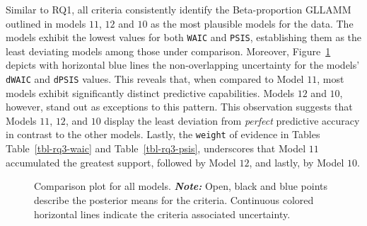 \documentclass[
  authoryear,
  preprint,
  1p]{elsarticle}
\begin{document}
Similar to RQ1, all criteria consistently identify the Beta-proportion
GLLAMM outlined in models \(11\), \(12\) and \(10\) as the most
plausible models for the data. The models exhibit the lowest values for
both \texttt{WAIC} and \texttt{PSIS}, establishing them as the least
deviating models among those under comparison. Moreover,
Figure~\ref{fig-rq3-waic-psis} depicts with horizontal blue lines the
non-overlapping uncertainty for the models' \texttt{dWAIC} and
\texttt{dPSIS} values. This reveals that, when compared to Model \(11\),
most models exhibit significantly distinct predictive capabilities.
Models \(12\) and \(10\), however, stand out as exceptions to this
pattern. This observation suggests that Models \(11\), \(12\), and
\(10\) display the least deviation from \emph{perfect} predictive
accuracy in contrast to the other models. Lastly, the \texttt{weight} of
evidence in Tables Table~\ref{tbl-rq3-waic} and
Table~\ref{tbl-rq3-psis}, underscores that Model \(11\) accumulated the
greatest support, followed by Model \(12\), and lastly, by Model \(10\).

\label{cell-fig-rq3-waic-psis}
\begin{figure}[H]


\caption{\label{fig-rq3-waic-psis}{Comparison plot for all models.
\textbf{\emph{Note:}} Open, black and blue points describe the posterior
means for the criteria. Continuous colored horizontal lines indicate the
criteria associated uncertainty.}}

\end{figure}%
\end{document}
